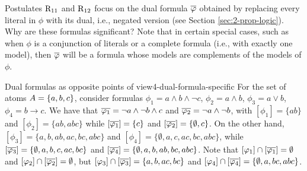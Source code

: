 Postulates $\mathrm{R}_{11}$ and $\mathrm{R}_{12}$ focus on the dual formula $\overline{\varphi}$
obtained by replacing every literal in $\phi$ with its dual, 
i.e., negated version (see Section \ref{sec:2-prop-logic}).
Why are these formulas significant?
Note that in certain special cases, 
such as when $\phi$ is a conjunction of literals 
or a complete formula (i.e., with exactly one model),
then $\overline{\varphi}$ will be a formula whose models are complements of the models of $\phi$.

\begin{xmpl}{Dual formulas as opposite points of view}{4-dual-formula-specific}
	For the set of atoms $A=\{a,b,c\}$,
	consider formulas 
	$\phi_1 = a\land b\land \lnot c$,
	$\phi_2 = a\land b$,
	$\phi_3 = a\lor b$,
	$\phi_4 = b\rightarrow c$.
	We have that 
	$\overline{\varphi_1}=\lnot a\land \lnot b\land c$
	and 
	$\overline{\varphi_2} = \lnot a \land \lnot b$,
	with
	$[\phi_1]=\{ab\}$ and $[\phi_2]=\{ab, abc\}$
	while $[\overline{\varphi_1}]=\{c\}$ and $[\overline{\varphi_2}]=\{\emptyset,c\}$.
	On the other hand, 
	$[\phi_3]=\{a,b,ab,ac,bc,abc\}$ and $[\phi_4]=\{\emptyset,a,c,ac,bc,abc\}$,
	while
	$[\overline{\varphi_3}]=\{\emptyset,a,b,c,ac,bc\}$ and $[\overline{\varphi_4}] = \{\emptyset,a,b,ab,bc,abc\}$.
	Note that $[\varphi_1]\cap[\overline{\varphi_1}]=\emptyset$ and $[\varphi_2]\cap[\overline{\varphi_2}]=\emptyset$,
	but
	$[\varphi_3]\cap[\overline{\varphi_3}]=\{a,b,ac,bc\}$ 
	and 
	$[\varphi_4]\cap[\overline{\varphi_4}]=\{\emptyset,a,bc,abc\}$.
\end{xmpl}

